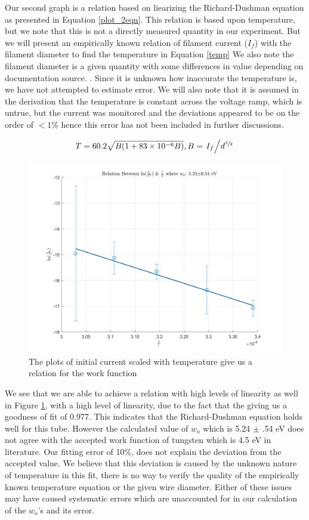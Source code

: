 Our second graph is a relation based on liearizing the Richard-Dushman equation as presented in Equation \ref{plot_2eqn}. This relation is based upon temperature, but we note that this is not a directly measured quantity in our experiment. But we will present an empirically known relation of filament current ($I_f$) with the filament diameter to find the temperature in Equation \ref{temp} \cite{LabProcedure} We also note the filament diameter is a given quantity with some differences in value depending on documentation source. \cite{LabProcedure} \cite{GRD7}. Since it is unknown how inaccurate the temperature is, we have not attempted to estimate error. We will also note that it is assumed in the derivation that the temperature is constant across the voltage ramp, which is untrue, but the current was monitored and the deviations appeared to be on the order of $< 1\%$ hence this error has not been included in further discussions. 

\begin{align}
    T = 60.2 \sqrt{B(1 + \num{83e-6} B )}, B = \left. I_f \middle /d^{\sfrac{3}{2}} \right. \label{temp}
\end{align}

\begin{figure}[ht!]
\includegraphics[scale=.8]{figures/plot_2wo.png}%
\caption{The plots of initial current scaled with temperature give us a relation for the work function }%
\label{fig:plot_2}
\end{figure}

We see that we are able to achieve a relation with high levels of linearity as well in Figure \ref{fig:plot_2}, with a high level of linearity, due to the fact that the giving us a goodness of fit of 0.977.  This indicates that the  Richard-Dushman equation holds well for this tube. However the calculated value of $w_o$ which is 5.24 $\pm$ .54 eV does not agree with the accepted work function of tungsten which is 4.5 eV in literature. Our fitting error of 10\%, does not explain the deviation from the accepted value. We believe that this deviation is caused by the unknown nature of temperature in this fit, there is no way to verify the quality of the empirically known temperature equation or the given wire diameter. Either of these issues may have caused systematic errors which are unaccounted for in our calculation of the $w_o$'s and its error.
